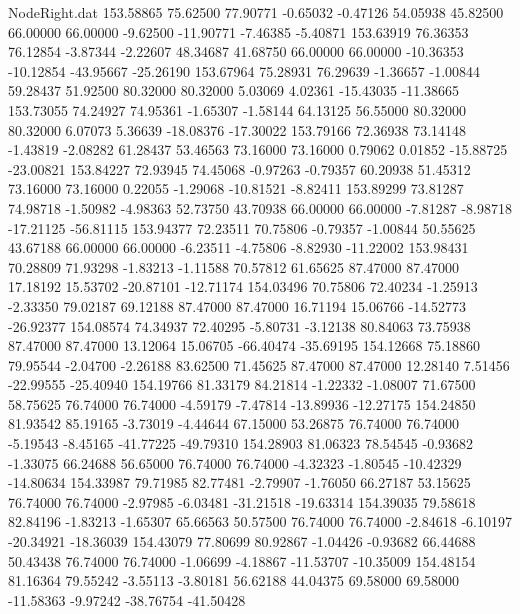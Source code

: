 \begin{filecontents}{NodeRight.dat}
 153.58865   75.62500   77.90771    -0.65032   -0.47126   54.05938   45.82500   66.00000   66.00000   -9.62500  -11.90771   -7.46385   -5.40871
 153.63919   76.36353   76.12854    -3.87344   -2.22607   48.34687   41.68750   66.00000   66.00000  -10.36353  -10.12854  -43.95667  -25.26190
 153.67964   75.28931   76.29639    -1.36657   -1.00844   59.28437   51.92500   80.32000   80.32000    5.03069    4.02361  -15.43035  -11.38665
 153.73055   74.24927   74.95361    -1.65307   -1.58144   64.13125   56.55000   80.32000   80.32000    6.07073    5.36639  -18.08376  -17.30022
 153.79166   72.36938   73.14148    -1.43819   -2.08282   61.28437   53.46563   73.16000   73.16000    0.79062    0.01852  -15.88725  -23.00821
 153.84227   72.93945   74.45068    -0.97263   -0.79357   60.20938   51.45312   73.16000   73.16000    0.22055   -1.29068  -10.81521   -8.82411
 153.89299   73.81287   74.98718    -1.50982   -4.98363   52.73750   43.70938   66.00000   66.00000   -7.81287   -8.98718  -17.21125  -56.81115
 153.94377   72.23511   70.75806    -0.79357   -1.00844   50.55625   43.67188   66.00000   66.00000   -6.23511   -4.75806   -8.82930  -11.22002
 153.98431   70.28809   71.93298    -1.83213   -1.11588   70.57812   61.65625   87.47000   87.47000   17.18192   15.53702  -20.87101  -12.71174
 154.03496   70.75806   72.40234    -1.25913   -2.33350   79.02187   69.12188   87.47000   87.47000   16.71194   15.06766  -14.52773  -26.92377
 154.08574   74.34937   72.40295    -5.80731   -3.12138   80.84063   73.75938   87.47000   87.47000   13.12064   15.06705  -66.40474  -35.69195
 154.12668   75.18860   79.95544    -2.04700   -2.26188   83.62500   71.45625   87.47000   87.47000   12.28140    7.51456  -22.99555  -25.40940
 154.19766   81.33179   84.21814    -1.22332   -1.08007   71.67500   58.75625   76.74000   76.74000   -4.59179   -7.47814  -13.89936  -12.27175
 154.24850   81.93542   85.19165    -3.73019   -4.44644   67.15000   53.26875   76.74000   76.74000   -5.19543   -8.45165  -41.77225  -49.79310
 154.28903   81.06323   78.54545    -0.93682   -1.33075   66.24688   56.65000   76.74000   76.74000   -4.32323   -1.80545  -10.42329  -14.80634
 154.33987   79.71985   82.77481    -2.79907   -1.76050   66.27187   53.15625   76.74000   76.74000   -2.97985   -6.03481  -31.21518  -19.63314
 154.39035   79.58618   82.84196    -1.83213   -1.65307   65.66563   50.57500   76.74000   76.74000   -2.84618   -6.10197  -20.34921  -18.36039
 154.43079   77.80699   80.92867    -1.04426   -0.93682   66.44688   50.43438   76.74000   76.74000   -1.06699   -4.18867  -11.53707  -10.35009
 154.48154   81.16364   79.55242    -3.55113   -3.80181   56.62188   44.04375   69.58000   69.58000  -11.58363   -9.97242  -38.76754  -41.50428

\end{filecontents}
